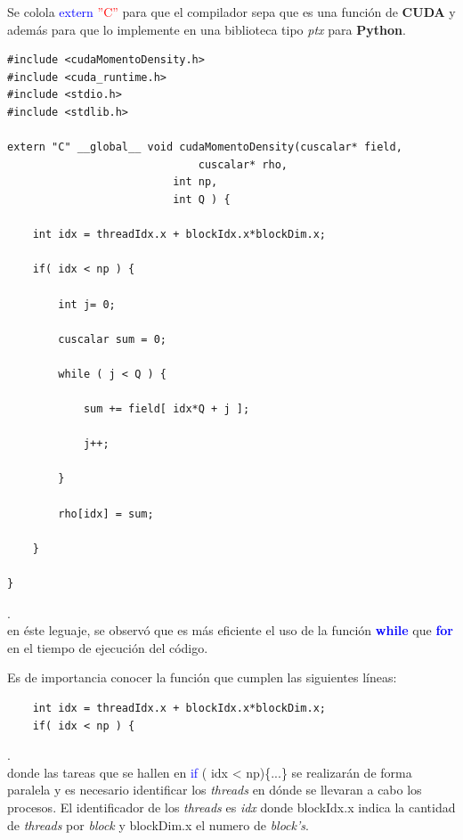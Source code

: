 Se colola \textcolor{blue}{extern} \textcolor{red}{''C''} para que el compilador sepa que es una función de \textbf{CUDA} y además para que lo implemente en una biblioteca tipo \textit{ptx} para \textbf{Python}.
\newpage
{\footnotesize
	\begin{frame}{}
		\begin{lstlisting}[frame=single]
#include <cudaMomentoDensity.h>
#include <cuda_runtime.h>
#include <stdio.h>
#include <stdlib.h>

extern "C" __global__ void cudaMomentoDensity(cuscalar* field,
				              cuscalar* rho,
					      int np,
					      int Q ) {
							
	int idx = threadIdx.x + blockIdx.x*blockDim.x;	
	
	if( idx < np ) {	
	
		int j= 0;		
	
		cuscalar sum = 0;		
	
		while ( j < Q ) {		
	
			sum += field[ idx*Q + j ];			
	
			j++;			
	
		}				
	
		rho[idx] = sum;	
	
	}
	
}		
		\end{lstlisting}
		
	\end{frame}
}.
\\
en éste leguaje, se observó que es más eficiente el uso de la función \textcolor{blue}{\textbf{while}} que \textcolor{blue}{\textbf{for}} en el tiempo de ejecución del código.

Es de importancia conocer la función que cumplen las siguientes líneas:
{\footnotesize
	\begin{frame}{}
		\begin{lstlisting}
	int idx = threadIdx.x + blockIdx.x*blockDim.x;	
	if( idx < np ) {	
		\end{lstlisting}
		
	\end{frame}
}.
\\
donde las tareas que se hallen en \textcolor{blue}{if} ( idx < np)\{...\} se realizarán de forma paralela y es necesario identificar los \textit{threads} en dónde se llevaran a cabo los procesos. El identificador de los \textit{threads} es \textit{idx} donde blockIdx.x  indica la cantidad de \textit{threads} por \textit{block} y blockDim.x el numero de \textit{block's}.

